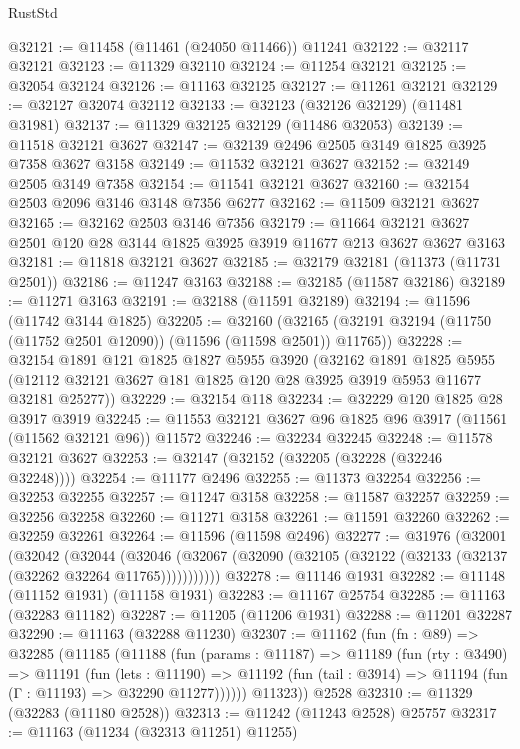 \begin{lexlean}{RustStd}
\begin{coremodule}
@32121 := @11458 (@11461 (@24050 @11466)) @11241
@32122 := @32117 @32121
@32123 := @11329 @32110
@32124 := @11254 @32121
@32125 := @32054 @32124
@32126 := @11163 @32125
@32127 := @11261 @32121
@32129 := @32127 @32074 @32112
@32133 := @32123 (@32126 @32129) (@11481 @31981)
@32137 := @11329 @32125 @32129 (@11486 @32053)
@32139 := @11518 @32121 @3627
@32147 := @32139 @2496 @2505 @3149 @1825 @3925 @7358 @3627 @3158
@32149 := @11532 @32121 @3627
@32152 := @32149 @2505 @3149 @7358
@32154 := @11541 @32121 @3627
@32160 := @32154 @2503 @2096 @3146 @3148 @7356 @6277
@32162 := @11509 @32121 @3627
@32165 := @32162 @2503 @3146 @7356
@32179 := @11664 @32121 @3627 @2501 @120 @28 @3144 @1825 @3925 @3919 @11677 @213 @3627 @3627 @3163
@32181 := @11818 @32121 @3627
@32185 := @32179 @32181 (@11373 (@11731 @2501))
@32186 := @11247 @3163
@32188 := @32185 (@11587 @32186)
@32189 := @11271 @3163
@32191 := @32188 (@11591 @32189)
@32194 := @11596 (@11742 @3144 @1825)
@32205 := @32160
    (@32165 (@32191 @32194 (@11750 (@11752 @2501 @12090)) (@11596 (@11598 @2501)) @11765))
@32228 := @32154
    @1891
    @121
    @1825
    @1827
    @5955
    @3920
    (@32162
      @1891
      @1825
      @5955
      (@12112 @32121 @3627 @181 @1825 @120 @28 @3925 @3919 @5953 @11677 @32181 @25277))
@32229 := @32154 @118
@32234 := @32229 @120 @1825 @28 @3917 @3919
@32245 := @11553 @32121 @3627 @96 @1825 @96 @3917 (@11561 (@11562 @32121 @96)) @11572
@32246 := @32234 @32245
@32248 := @11578 @32121 @3627
@32253 := @32147 (@32152 (@32205 (@32228 (@32246 @32248))))
@32254 := @11177 @2496
@32255 := @11373 @32254
@32256 := @32253 @32255
@32257 := @11247 @3158
@32258 := @11587 @32257
@32259 := @32256 @32258
@32260 := @11271 @3158
@32261 := @11591 @32260
@32262 := @32259 @32261
@32264 := @11596 (@11598 @2496)
@32277 := @31976
    (@32001
      (@32042
        (@32044
          (@32046 (@32067 (@32090 (@32105 (@32122 (@32133 (@32137 (@32262 @32264 @11765)))))))))))
@32278 := @11146 @1931
@32282 := @11148 (@11152 @1931) (@11158 @1931)
@32283 := @11167 @25754
@32285 := @11163 (@32283 @11182)
@32287 := @11205 (@11206 @1931)
@32288 := @11201 @32287
@32290 := @11163 (@32288 @11230)
@32307 := @11162
    (fun (fn : @89) =>
    @32285
      (@11185
        (@11188
          (fun (params : @11187) =>
          @11189
            (fun (rty : @3490) =>
            @11191
              (fun (lets : @11190) =>
              @11192 (fun (tail : @3914) => @11194 (fun (Γ : @11193) => @32290 @11277))))))
        @11323))
    @2528
@32310 := @11329 (@32283 (@11180 @2528))
@32313 := @11242 (@11243 @2528) @25757
@32317 := @11163 (@11234 (@32313 @11251) @11255)

\end{coremodule}
\end{lexlean}
